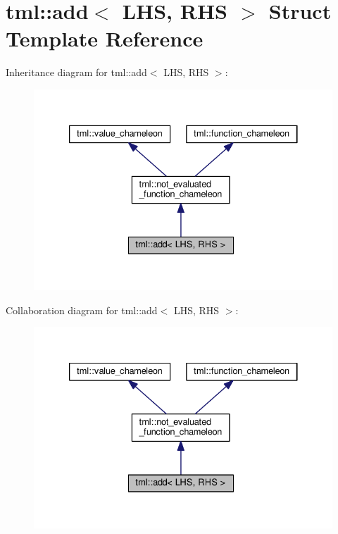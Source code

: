 \hypertarget{structtml_1_1add}{\section{tml\+:\+:add$<$ L\+H\+S, R\+H\+S $>$ Struct Template Reference}
\label{structtml_1_1add}
}


Inheritance diagram for tml\+:\+:add$<$ L\+H\+S, R\+H\+S $>$\+:
\nopagebreak
\begin{figure}[H]
\begin{center}
\leavevmode
\includegraphics[width=333pt]{structtml_1_1add__inherit__graph}
\end{center}
\end{figure}


Collaboration diagram for tml\+:\+:add$<$ L\+H\+S, R\+H\+S $>$\+:
\nopagebreak
\begin{figure}[H]
\begin{center}
\leavevmode
\includegraphics[width=333pt]{structtml_1_1add__coll__graph}
\end{center}
\end{figure}
